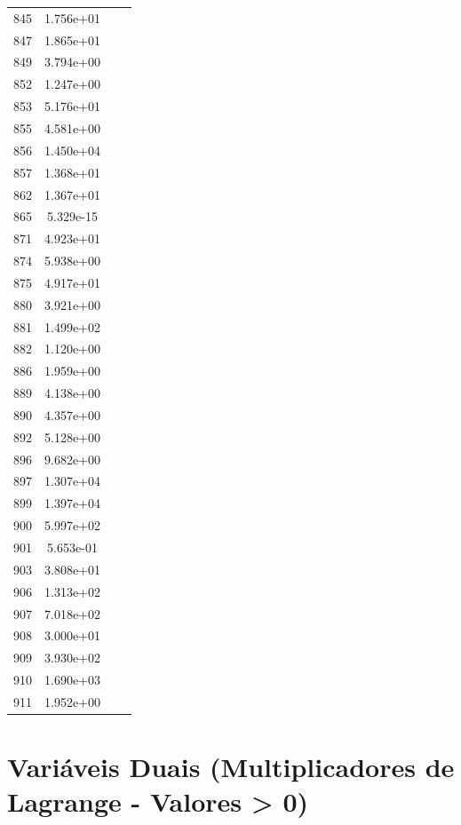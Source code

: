 \documentclass[12pt]{article}
\begin{document}
\begin{longtable}{@{}cccc@{}}
845 & 1.756e+01 &  &  \\
847 & 1.865e+01 &  &  \\
849 & 3.794e+00 &  &  \\
852 & 1.247e+00 &  &  \\
853 & 5.176e+01 &  &  \\
855 & 4.581e+00 &  &  \\
856 & 1.450e+04 &  &  \\
857 & 1.368e+01 &  &  \\
862 & 1.367e+01 &  &  \\
865 & 5.329e-15 &  &  \\
871 & 4.923e+01 &  &  \\
874 & 5.938e+00 &  &  \\
875 & 4.917e+01 &  &  \\
880 & 3.921e+00 &  &  \\
881 & 1.499e+02 &  &  \\
882 & 1.120e+00 &  &  \\
886 & 1.959e+00 &  &  \\
889 & 4.138e+00 &  &  \\
890 & 4.357e+00 &  &  \\
892 & 5.128e+00 &  &  \\
896 & 9.682e+00 &  &  \\
897 & 1.307e+04 &  &  \\
899 & 1.397e+04 &  &  \\
900 & 5.997e+02 &  &  \\
901 & 5.653e-01 &  &  \\
903 & 3.808e+01 &  &  \\
906 & 1.313e+02 &  &  \\
907 & 7.018e+02 &  &  \\
908 & 3.000e+01 &  &  \\
909 & 3.930e+02 &  &  \\
910 & 1.690e+03 &  &  \\
911 & 1.952e+00 &  &  \\

\bottomrule
\end{longtable}


\section{Variáveis Duais (Multiplicadores de Lagrange - Valores > 0)}
\end{document}
